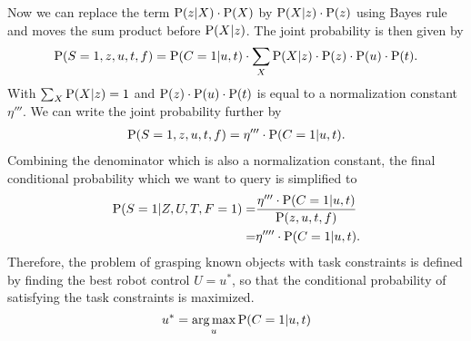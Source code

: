 Now we can replace the term $\operatorname*{\text{P}}(z|X) \cdot \operatorname*{\text{P}}(X)$ by  $\operatorname*{\text{P}}(X|z)\cdot\operatorname*{\text{P}}(z)$ using Bayes rule and moves the sum product before $\operatorname*{\text{P}}(X|z)$. The joint probability is then given by  
\begin{equation}
\begin{split}
 \operatorname*{\text{P}}(S = 1, z, u, t, f) = \operatorname*{\text{P}}(C=1|u,t) \cdot \sum_{X} \operatorname*{\text{P}}(X|z)\cdot\operatorname*{\text{P}}(z) \cdot \operatorname*{\text{P}}(u) \cdot \operatorname*{\text{P}}(t).
\end{split}              
\end{equation}
With $\sum_{X} \operatorname*{\text{P}}(X|z) = 1$ and $\operatorname*{\text{P}}(z) \cdot \operatorname*{\text{P}}(u) \cdot \operatorname*{\text{P}}(t)$ is equal to a normalization constant $\eta'''$. We can write the joint probability further by 
\begin{equation}
\begin{split}
 \operatorname*{\text{P}}(S = 1, z, u, t, f) = \eta''' \cdot  \operatorname*{\text{P}}(C=1|u,t). 
\end{split}              
\end{equation}
Combining the denominator which is also a normalization constant, the final conditional probability which we want to query is simplified to 
\begin{equation}
\begin{split}
 \operatorname*{\text{P}}(S = 1 | Z, U, T, F  = 1) =& \frac{\eta''' \cdot  \operatorname*{\text{P}}(C=1|u,t)}{\operatorname*{\text{P}}(z,u,t,f)} \\
     						  =& \eta'''' \cdot  \operatorname*{\text{P}}(C=1 | u,t). 
\end{split}              
\end{equation}
Therefore, the problem of grasping known objects with task constraints is defined by finding the best robot control $U=u^*$, so that the conditional probability of satisfying the task constraints is maximized.  
\begin{equation}
  u^* = \operatorname*{arg\,max}_{u} \operatorname*{\text{P}}(C=1 | u,t)  
\end{equation}

  
